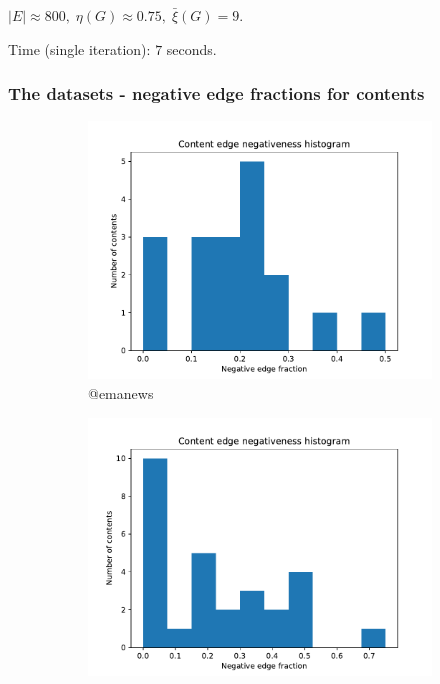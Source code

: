 \documentclass{beamer}
\begin{document}
\begin{frame}[c]
	$|E| \approx 800, \; \eta(G) \approx 0.75, \; \bar{\xi}(G) = 9$.

	Time (single iteration): $7$ seconds.
\end{frame}

\begin{frame}[c]
	\frametitle{The datasets - negative edge fractions for contents}
	\begin{figure}
		\begin{center}
			\begin{subfigure}[b]{0.4\textwidth}
				\centering
				\includegraphics[width=\textwidth]{out/emanews200/neg-fraction-content-hist.pdf}
				\caption{@emanews}
				\label{fig:out/emanews200/neg-fraction-content-hist.pdf}
			\end{subfigure}
			\begin{subfigure}[b]{0.4\textwidth}
				\centering
				\includegraphics[width=\textwidth]{out/bbcscience200/neg-fraction-content-hist.pdf}

\end{subfigure}
\end{center}
\end{figure}
\end{frame}
\end{document}
